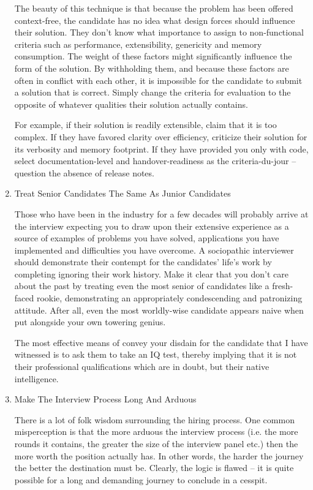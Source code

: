 \documentclass{article}
\begin{document}
\begin{enumerate}
The beauty of this technique is that because the problem has been
offered context-free, the candidate has no idea what design forces
should influence their solution. They don't know what importance to
assign to non-functional criteria such as performance, extensibility,
genericity and memory consumption. The weight of these factors might
significantly influence the form of the solution. By withholding them,
and because these factors are often in conflict with each other, it is
impossible for the candidate to submit a solution that is correct.
Simply change the criteria for evaluation to the opposite of whatever
qualities their solution actually contains.

For example, if their solution is readily extensible, claim that it is
too complex. If they have favored clarity over efficiency, criticize
their solution for its verbosity and memory footprint. If they have
provided you only with code, select documentation-level and
handover-readiness as the criteria-du-jour -- question the absence of
release notes.

\item Treat Senior Candidates The Same As Junior Candidates
\label{sec:orgheadline68}

Those who have been in the industry for a few decades will probably
arrive at the interview expecting you to draw upon their extensive
experience as a source of examples of problems you have solved,
applications you have implemented and difficulties you have overcome. A
sociopathic interviewer should demonstrate their contempt for the
candidates' life's work by completing ignoring their work history. Make
it clear that you don't care about the past by treating even the most
senior of candidates like a fresh-faced rookie, demonstrating an
appropriately condescending and patronizing attitude. After all, even
the most worldly-wise candidate appears naive when put alongside your
own towering genius.

The most effective means of convey your disdain for the candidate that I
have witnessed is to ask them to take an IQ test, thereby implying that
it is not their professional qualifications which are in doubt, but
their native intelligence.

\item Make The Interview Process Long And Arduous
\label{sec:orgheadline69}

There is a lot of folk wisdom surrounding the hiring process. One common
misperception is that the more arduous the interview process (i.e. the
more rounds it contains, the greater the size of the interview panel
etc.) then the more worth the position actually has. In other words, the
harder the journey the better the destination must be. Clearly, the
logic is flawed -- it is quite possible for a long and demanding journey
to conclude in a cesspit.


\end{enumerate}
\end{document}
